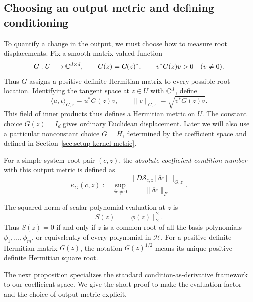 \subsection{Choosing an output metric and defining conditioning}

To quantify a change in the output, we must choose how to measure root
displacements. Fix a smooth matrix-valued function
\[
 G:U\longrightarrow\mathbb C^{d\times d},\qquad
 G(z)=G(z)^*,\qquad v^*G(z)v>0\quad(v\ne0).
\]
Thus $G$ assigns a positive definite Hermitian matrix to every possible root
location. Identifying the tangent space at
$z\in U$ with $\mathbb C^d$, define
\[
 \langle u,v\rangle_{G,z}=u^*G(z)v,\qquad
 \|v\|_{G,z}=\sqrt{v^*G(z)v}.
\]
This field of inner products thus defines a Hermitian metric on $U$. The constant
choice $G(z)=I_d$ gives ordinary Euclidean displacement. Later we will also
use a particular nonconstant choice $G=H$, determined by the coefficient
space and defined in Section~\ref{sec:setup-kernel-metric}.

\begin{definition}
For a simple system--root pair $(c,z)$, the \emph{absolute coefficient
condition number} with this output metric is defined as 
\begin{equation}\label{eq:setup-condition-definition}
 \kappa_G(c,z)
 :=\sup_{\delta c\ne0}
    \frac{\|D\mathcal S_{c,z}[\delta c]\|_{G,z}}{\|\delta c\|_F}.
\end{equation}
\end{definition}

The squared norm of scalar polynomial evaluation at $z$ is
\[
 S(z)=\|\phi(z)\|_2^2.
\]
Thus $S(z)=0$ if and only if $z$ is a common root of all the basis polynomials
$\phi_1,\ldots,\phi_m$, or equivalently of every polynomial in $\mathcal H$.
For a positive definite Hermitian matrix $G(z)$, the notation $G(z)^{1/2}$
means its unique positive definite Hermitian square root.

The next proposition specializes the standard condition-as-derivative
framework \cite[Chapter~14]{burgisser2013condition} to our coefficient space.
We give the short proof to make the evaluation factor and the choice of
output metric explicit.

